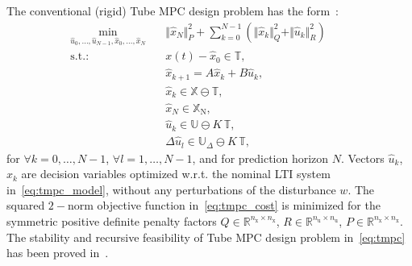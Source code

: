 \documentclass[letterpaper, 10 pt, conference]{ieeeconf}
\begin{document}


The conventional (rigid) Tube MPC design problem has the form~\cite{MS05}:
\begin{subequations}
	\label{eq:tmpc}
	\begin{eqnarray}
		\label{eq:tmpc_cost}
		\min_{\hat{u}_{0},\ldots,\hat{u}_{N-1}, \hat{x}_{0},\ldots,\hat{x}_{N} } \!\!\!\!\!\!\!\!\!\!\! &\,& \Vert \hat{x}_{N} \Vert_{P}^{2} + \sum_{k=0}^{N-1} \left( \Vert \hat{x}_{k} \Vert_{Q}^{2} + \Vert \hat{u}_{k} \Vert_{R}^{2} \right) \qquad \\
		\label{eq:tmpc_rpi}
		\mathrm{s.t.\!:} &\,& x(t) - \hat{x}_{0} \in \mathbb{T} , \\
		\label{eq:tmpc_model}
		&\,&  \hat{x}_{k+1} = A \hat{x}_{k} + B \hat{u}_{k} , \\
		\label{eq:tmpc_constraints_state}
		&\,& \hat{x}_{k} \in \mathbb{X} \ominus \mathbb{T} , \\
		\label{eq:tmpc_constraints_terminal}
		&\,& \hat{x}_{N} \in \mathbb{X}_{\mathrm{N}}, \\
		\label{eq:tmpc_constraints_input}
		&\,& \hat{u}_{k} \in \mathbb{U} \ominus K \, \mathbb{T} , \\
		\label{eq:tmpc_constraints_input_delta_k}
		&\,& \Delta \hat{u}_{l} \in \mathbb{U}_{\Delta} \ominus K \, \mathbb{T} , %
	\end{eqnarray}
\end{subequations}
for $\forall k = 0, \dots, N-1$,  $\forall l = 1, \dots, N-1$, and for prediction horizon $N$. Vectors $\hat{u}_{k}$, $\hat{x}_{k}$ are decision variables optimized w.r.t. the nominal LTI system in~\eqref{eq:tmpc_model}, without any perturbations of the disturbance $w$. 
The squared $2-$norm objective function in~\eqref{eq:tmpc_cost} is minimized for the symmetric positive definite penalty factors $Q \in \mathbb{R}^{n_{\mathrm{x}} \times n_{\mathrm{x}}}$, $R \in \mathbb{R}^{n_{\mathrm{u}} \times n_{\mathrm{u}}}$, $P \in \mathbb{R}^{n_{\mathrm{x}} \times n_{\mathrm{x}}}$. 
The stability and recursive feasibility of Tube MPC design problem in~\eqref{eq:tmpc} has been proved in~\cite{MS05}.
\end{document}
